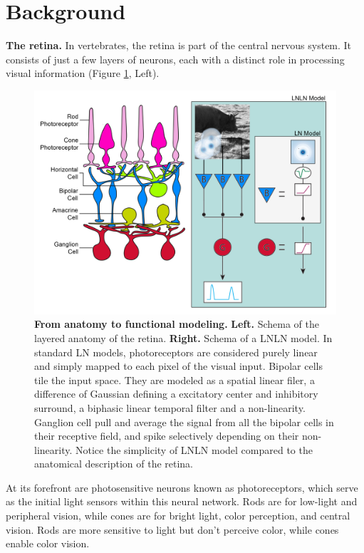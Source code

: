 \section{Background}\label{sec:background}

\textbf{The retina.}
In vertebrates, the retina is part of the central nervous system. It consists
of just a few layers of neurons, each with a distinct role in processing visual
information (Figure \ref{fig:retina_structure}, Left).

\begin{figure}[h]
    \centering
    \includegraphics[width=\textwidth]{pics/RetinaAnatToFunction.png}
    \caption{\textbf{From anatomy to functional modeling.} \textbf{Left.}
        Schema of the layered anatomy of the retina. \textbf{Right.} Schema of
        a LNLN
        model. In standard LN
        models,
        photoreceptors are considered purely linear and simply mapped to each
        pixel of
        the visual input. Bipolar cells tile the input space. They are modeled
        as a
        spatial linear filer, a difference of Gaussian defining a excitatory
        center and
        inhibitory surround, a biphasic linear temporal filter and a
        non-linearity.
        Ganglion cell pull and average the signal from all the bipolar cells in
        their
        receptive field, and spike selectively depending on their
        non-linearity. Notice the simplicity of LNLN model compared to the
        anatomical
        description of the retina.}
    \label{fig:retina_structure}
\end{figure}

At its forefront are photosensitive neurons known as photoreceptors, which
serve as the initial light sensors within this neural network. Rods are for
low-light
and peripheral vision, while cones are for bright light, color perception, and
central vision. Rods are more sensitive to light but don't perceive color,
while cones enable color vision.

